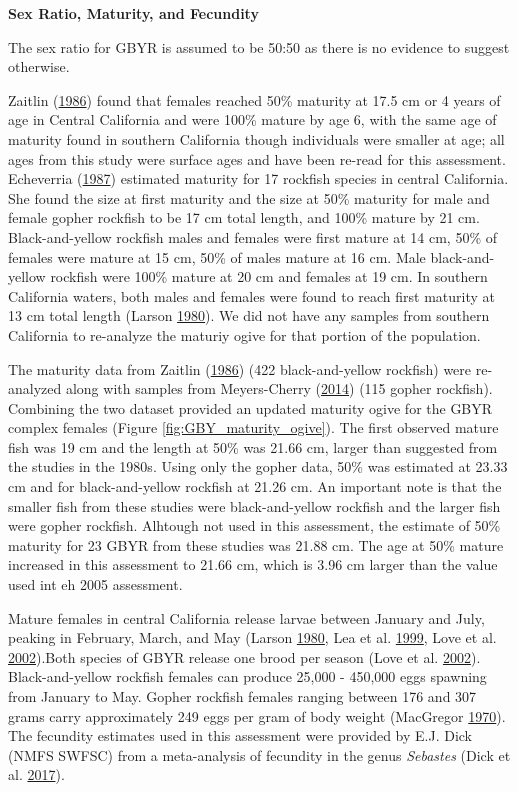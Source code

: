 \documentclass[12pt,]{article}
\begin{document}
\vspace{.5cm} \textbf{Sex Ratio, Maturity, and Fecundity}

The sex ratio for GBYR is assumed to be 50:50 as there is no evidence to
suggest otherwise.

Zaitlin (\protect\hyperlink{ref-Zaitlin1986}{1986}) found that females
reached 50\% maturity at 17.5 cm or 4 years of age in Central California
and were 100\% mature by age 6, with the same age of maturity found in
southern California though individuals were smaller at age; all ages
from this study were surface ages and have been re-read for this
assessment. Echeverria (\protect\hyperlink{ref-Echeverria1987}{1987})
estimated maturity for 17 rockfish species in central California. She
found the size at first maturity and the size at 50\% maturity for male
and female gopher rockfish to be 17 cm total length, and 100\% mature by
21 cm. Black-and-yellow rockfish males and females were first mature at
14 cm, 50\% of females were mature at 15 cm, 50\% of males mature at 16
cm. Male black-and-yellow rockfish were 100\% mature at 20 cm and
females at 19 cm. In southern California waters, both males and females
were found to reach first maturity at 13 cm total length (Larson
\protect\hyperlink{ref-Larson1980}{1980}). We did not have any samples
from southern California to re-analyze the maturiy ogive for that
portion of the population.

The maturity data from Zaitlin
(\protect\hyperlink{ref-Zaitlin1986}{1986}) (422 black-and-yellow
rockfish) were re-analyzed along with samples from Meyers-Cherry
(\protect\hyperlink{ref-MeyersCherry2014}{2014}) (115 gopher rockfish).
Combining the two dataset provided an updated maturity ogive for the
GBYR complex females (Figure \ref{fig:GBY_maturity_ogive}). The first
observed mature fish was 19 cm and the length at 50\% was 21.66 cm,
larger than suggested from the studies in the 1980s. Using only the
gopher data, 50\% was estimated at 23.33 cm and for black-and-yellow
rockfish at 21.26 cm. An important note is that the smaller fish from
these studies were black-and-yellow rockfish and the larger fish were
gopher rockfish. Alhtough not used in this assessment, the estimate of
50\% maturity for 23 GBYR from these studies was 21.88 cm. The age at
50\% mature increased in this assessment to 21.66 cm, which is 3.96 cm
larger than the value used int eh 2005 assessment.

Mature females in central California release larvae between January and
July, peaking in February, March, and May (Larson
\protect\hyperlink{ref-Larson1980}{1980}, Lea et al.
\protect\hyperlink{ref-Lea1999}{1999}, Love et al.
\protect\hyperlink{ref-Love2002}{2002}).Both species of GBYR release one
brood per season (Love et al. \protect\hyperlink{ref-Love2002}{2002}).
Black-and-yellow rockfish females can produce 25,000 - 450,000 eggs
spawning from January to May. Gopher rockfish females ranging between
176 and 307 grams carry approximately 249 eggs per gram of body weight
(MacGregor \protect\hyperlink{ref-MacGregor1970}{1970}). The fecundity
estimates used in this assessment were provided by E.J. Dick (NMFS
SWFSC) from a meta-analysis of fecundity in the genus \emph{Sebastes}
(Dick et al. \protect\hyperlink{ref-Dick2017}{2017}).
\end{document}
